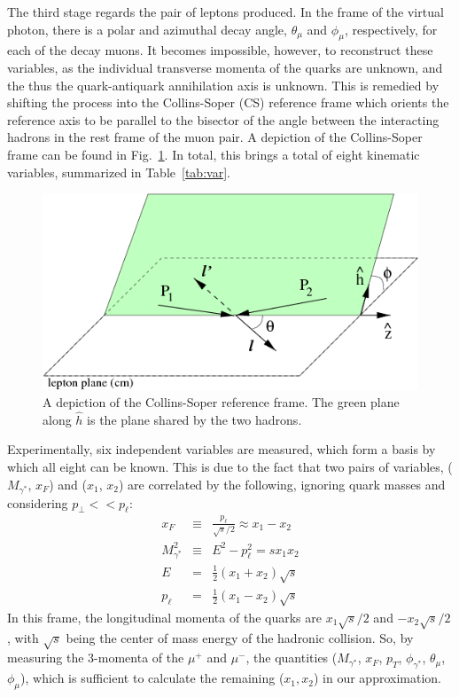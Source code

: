 The third stage regards the pair of leptons produced. In the frame of the virtual photon, there is a polar and azimuthal decay angle, $\theta_\mu$ and $\phi_\mu$, respectively, for each of the decay muons. It becomes impossible, however, to reconstruct these variables, as the individual transverse momenta of the quarks are unknown, and the thus the quark-antiquark annihilation axis is unknown. This is remedied by shifting the process into the Collins-Soper (CS) reference frame\cite{PhysRevD.16.2219} which orients the reference axis to be parallel to the bisector of the angle between the interacting hadrons in the rest frame of the muon pair. A depiction of the Collins-Soper frame can be found in Fig.~\ref{fig:collins-soper}. In total, this brings a total of eight kinematic variables, summarized in Table~\ref{tab:var}.
\begin{figure}
	\centering
	\includegraphics[width=4.50in]{figures/background/collins-soper.png}
	\caption{A depiction of the Collins-Soper reference frame. The green plane along $\hat{h}$ is the plane shared by the two hadrons.}
	\label{fig:collins-soper}
\end{figure}

Experimentally, six independent variables are measured, which form a basis by which all eight can be known. This is due to the fact that two pairs of variables, ($M_{\gamma^*}$, $x_F$) and ($x_1$, $x_2$) are correlated by the following, ignoring quark masses and considering $p_\perp << p_{\ell}$:
\begin{eqnarray}
x_F & \equiv & \frac{p_{\ell}}{\sqrt{s}/2} \approx x_1 - x_2 \label{eq:xf=x1-x2} \\
M_{\gamma^*}^2 & \equiv & E^2 - p_{\ell}^2  = s x_1 x_2 \label{eq:m=sx1x2} \\
E & = & \frac{1}{2}(x_1 + x_2) \sqrt{s} \\
p_{\ell} & = & \frac{1}{2}(x_1 - x_2)\sqrt{s}
\end{eqnarray}
In this frame, the longitudinal momenta of the quarks are $x_1 \sqrt{s}/2$ and $- x_2 \sqrt{s}/2$, with $\sqrt{s}$ being the center of mass energy of the hadronic collision. So, by measuring the 3-momenta of the $\mu^+$ and $\mu^-$, the quantities ($M_{\gamma^*}$, $x_F$, $p_T$, $\phi_{\gamma^*}$, $\theta_\mu$, $\phi_\mu$), which is sufficient to calculate the remaining ($x_1, x_2$) in our approximation.

